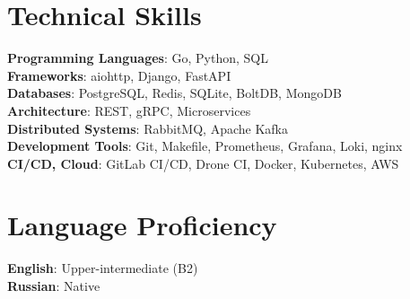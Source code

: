\documentclass[letterpaper,11pt]{article}
\begin{document}
\section{Technical Skills}
 \begin{itemize}[leftmargin=0.15in, label={}]
    \small{\item{
     \textbf{Programming Languages}{: Go, Python, SQL} \\
     \textbf{Frameworks}{: aiohttp, Django, FastAPI} \\
     \textbf{Databases}{: PostgreSQL, Redis, SQLite, BoltDB, MongoDB}\\
     \textbf{Architecture}{: REST, gRPC, Microservices}\\
     \textbf{Distributed Systems}{: RabbitMQ, Apache Kafka}\\
     \textbf{Development Tools}{: Git, Makefile, Prometheus, Grafana, Loki, nginx} \\
     \textbf{CI/CD, Cloud}{: GitLab CI/CD, Drone CI, Docker, Kubernetes, AWS}\\
    }}
 \end{itemize}

\section{Language Proficiency}
 \begin{itemize}[leftmargin=0.15in, label={}]
    \small{\item{
     \textbf{English}{: Upper-intermediate (B2)} \\
     \textbf{Russian}{: Native}
    }}
 \end{itemize}
\end{document}
